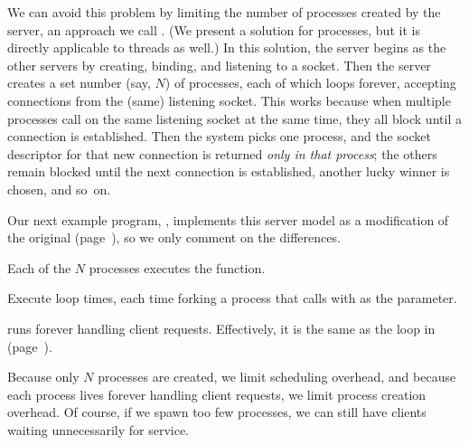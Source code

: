 We can avoid this problem by limiting the number of
processes created by the server, an approach we call
. (We present a solution for 
processes, but it is directly applicable to threads as well.) In this
solution, the server begins as the other servers by creating, binding,
and listening to a socket.  Then the server creates a set number (say,
$N$) of processes, each of which loops forever, accepting connections
from the (same) listening socket.
This works because
when multiple processes call  on the same
listening socket at the same
time, they all block until a connection is established.
Then the system picks one process, and the socket descriptor for that
new connection is returned \emph{only in that process};
the others remain blocked until the next connection is established,
another lucky winner is chosen, and so~on.

Our next example program, , implements this 
server model as a modification of the original 
(page~\pageref{code/TCPEchoServer.c}), so we only
comment on the differences.


\begin{topcode}


Each of the $N$ processes executes the  function.


Execute loop  times, each time forking a process
that calls  with  as the parameter.



 runs forever handling client requests.
Effectively, it is the same as the  loop in
 (page~\pageref{code/TCPEchoServer.c}).

\end{topcode}

\noindent Because only $N$ processes are created, we limit scheduling
overhead, and because each process lives forever
handling client requests, we limit process creation overhead.   Of
course, if we spawn too few processes, we can still have clients waiting
unnecessarily for service.  

